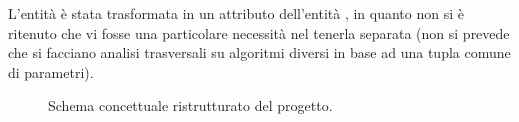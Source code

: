 \documentclass{article}
\begin{document}
L'entità  è stata trasformata in un attributo dell'entità , in quanto non si è ritenuto che vi fosse una particolare necessità nel tenerla separata (non si prevede che si facciano analisi trasversali su algoritmi diversi in base ad una tupla comune di parametri).

\begin{figure}[H]
    \caption{Schema concettuale ristrutturato del progetto.}
\end{figure}
\end{document}
